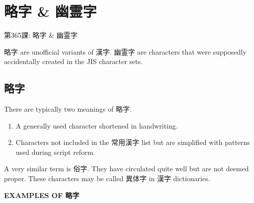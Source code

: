     
\chapter{略字 \& 幽霊字}

\begin{center}
\begin{Large}
第365課: 略字 \& 幽霊字 
\end{Large}
\end{center}
 
\par{ 略字 are unofficial variants of 漢字. 幽霊字 are characters that were supposedly accidentally created in the JIS character sets.  }
      
\section{略字}
 
\par{ There are typically two meanings of 略字. }

\begin{enumerate}

\item A generally used character shortened in handwriting. \hfill\break

\item Characters not included in the 常用漢字 list but are simplified with patterns used during script reform. \hfill\break

\end{enumerate}

\par{A very similar term is 俗字. They have circulated quite well but are not deemed proper. These characters may be called 異体字 in 漢字 dictionaries. }

\par{\textbf{EXAMPLES OF 略字 }}

